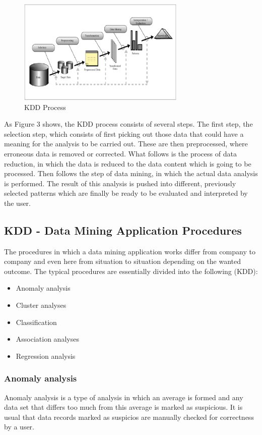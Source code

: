 \documentclass[12pt,twocolumn,twoside]{conference}   %
\begin{document}
\begin{figure}[H]
\centering
\includegraphics[width=8cm]{Abbildungen/KDD.png}
\caption{KDD Process}\label{visina8}
\end{figure}

As Figure 3 shows, the KDD process consists of several steps. The first step, the selection step, which consists of first picking out those data that could have a meaning for the analysis to be carried out. These are then preprocessed, where erroneous data is removed or corrected. What follows is the process of data reduction, in which the data is reduced to the data content which is going to be processed. Then follows the step of data mining, in which the actual data analysis is performed. The result of this analysis is pushed into different, previously selected patterns which are finally be ready to be evaluated and interpreted by the user.


\subsection{KDD - Data Mining Application Procedures}
The procedures in which a data mining application works differ from company to company and even here from situation to situation depending on the wanted outcome. The typical procedures are essentially divided into the following (KDD):

\begin{itemize}
\item Anomaly analysis
\item Cluster analyses
\item Classification
\item Association analyses
\item Regression analysis
\end{itemize}

\subsubsection{Anomaly analysis}
Anomaly analysis is a type of analysis in which an average is formed and any data set that differs too much from this average is marked as suspicious. It is usual that data records marked as suspicios are manually checked for correctness by a user.
\end{document}
